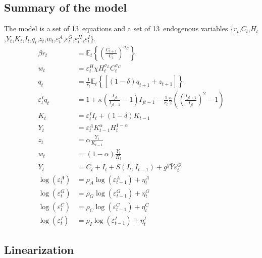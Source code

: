\documentclass[a4paper,12pt]{article}%
\begin{document}
\subsection{Summary of the model}

The model is a set of 13\ equations and a set of 13\ endogenous variables
\{$r_{t}$,$C_{t}$,$H_{t}$,$Y_{t}$,$K_{t}$,$I_{t}$,$q_{t}$,$z_{t}$,$w_{t}%
$,$\varepsilon_{t}^{A}$,$\varepsilon_{t}^{G}$,$\varepsilon_{t}^{H}%
$,$\varepsilon_{t}^{I}$\}.
\begin{align*}
\beta r_{t} &  =\mathbb{E}_{t}\left\{  \left(  \frac{C_{t+1}}{C_{t}}\right)
^{\sigma_{C}}\right\}  \\
w_{t} &  =\varepsilon_{t}^{H}\chi H_{t}^{\sigma_{L}}C_{t}^{\sigma_{C}}\\
q_{t} &  =\frac{1}{r_{t}}\mathbb{E}_{t}\left\{  \left[  \overset{}{\left(
1-\delta\right)  }q_{t+1}+z_{t+1}\right]  \right\}  \\
\varepsilon_{t}^{I}q_{t} &  =1+\kappa\left(  \frac{I_{jt}}{I_{jt-1}}-1\right)
I_{jt-1}-\frac{1}{r_{t}}\frac{\kappa}{2}\left(  \left(  \frac{I_{jt+1}}%
{I_{jt}}\right)  ^{2}-1\right)  \\
K_{t} &  =\varepsilon_{t}^{I}I_{t}+\left(  1-\delta\right)  K_{t-1}\\
Y_{t} &  =\varepsilon_{t}^{A}K_{t-1}^{\alpha}{}H_{t}^{1-\alpha}{}\\
z_{t} &  =\alpha\frac{Y_{t}}{K_{t-1}}\\
w_{t} &  =\left(  1-\alpha\right)  \frac{Y_{t}}{H_{t}}\\
Y_{t} &  =C_{t}+I_{t}+S\left(  I_{t},I_{t-1}\right)  +g^{y}\bar{Y}%
\varepsilon_{t}^{G}\\
\log\left(  \varepsilon_{t}^{A}\right)   &  =\rho_{A}\log\left(
\varepsilon_{t-1}^{A}\right)  +\eta_{t}^{A}\\
\log\left(  \varepsilon_{t}^{G}\right)   &  =\rho_{G}\log\left(
\varepsilon_{t-1}^{G}\right)  +\eta_{t}^{G}\\
\log\left(  \varepsilon_{t}^{C}\right)   &  =\rho_{C}\log\left(
\varepsilon_{t-1}^{C}\right)  +\eta_{t}^{C}\\
\log\left(  \varepsilon_{t}^{I}\right)   &  =\rho_{I}\log\left(
\varepsilon_{t-1}^{I}\right)  +\eta_{t}^{I}%
\end{align*}


\subsection{Linearization}
\end{document}
